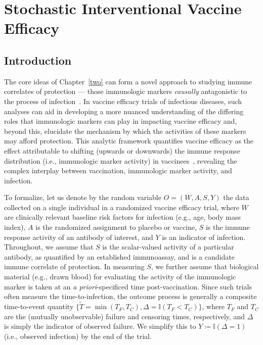 \chapter{Stochastic Interventional Vaccine Efficacy}\label{three}

\section{Introduction}

The core ideas of Chapter~\ref{two} can form a novel approach to studying immune
correlates of protection --- those immunologic markers \textit{causally}
antagonistic to the process of infection~\citep{plotkin2012nomenclature}. In
vaccine efficacy trials of infectious diseases, such analyses can aid in
developing a more nuanced understanding of the differing roles that immunologic
markers can play in impacting vaccine efficacy and, beyond this, elucidate the
mechanism by which the activities of these markers may afford protection. This
analytic framework quantifies vaccine efficacy as the effect attributable to
shifting (upwards or downwards) the immune response distribution (i.e.,
immunologic marker activity) in vaccinees~\citep{hejazi2020efficient}, revealing
the complex interplay between vaccination, immunologic marker activity, and
infection.

To formalize, let us denote by the random variable $O = (W, A, S, Y)$ the data
collected on a single individual in a randomized vaccine efficacy trial,
where $W$ are clinically relevant baseline risk factors for infection (e.g.,
age, body mass index), $A$ is the randomized assignment to placebo or vaccine,
$S$ is the immune response activity of an antibody of interest, and $Y$ is an
indicator of infection. Throughout, we assume that $S$ is the scalar-valued
activity of a particular antibody, as quantified by an established immunoassay,
and is a candidate immune correlate of protection. In measuring $S$, we further
assume that biological material (e.g., drawn blood) for evaluating the activity
of the immunologic marker is taken at an \textit{a priori}-specificed time
post-vaccination. Since such trials often measure the time-to-infection, the
outcome process is generally a composite time-to-event quantity
$\{\tilde{T} = \min(T_F, T_C), \Delta = \mathbb{I}(T_F < T_C)\}$, where $T_F$
and $T_C$ are the (mutually unobservable) failure and censoring times,
respectively, and $\Delta$ is simply the indicator of observed failure. We
simplify this to $Y \coloneqq \mathbb{I}(\Delta = 1)$ (i.e., observed infection)
by the end of the trial.

